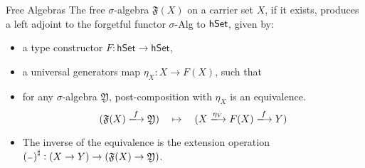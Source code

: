 \documentclass[9pt]{beamer}
\begin{document}
\begin{frame}{Free Algebras}
The free $\sigma$-algebra $\mathfrak{F}(X)$ on a carrier set $X$, \alert{if it exists}, produces a \alert{left adjoint} to the forgetful functor $\sigma$-Alg to $\mathsf{hSet}$, given by:
\begin{itemize}
    \item a type constructor $F : \mathsf{hSet} \to \mathsf{hSet}$,
    \item a universal generators map $\eta_X : X \to F(X)$, such that
    \item for any $\sigma$-algebra $\mathfrak{Y}$, post-composition with $\eta_X$ is an equivalence.
    \[
      (\str{F}{(X)} \xto{f} \mathfrak{Y}) \quad\mapsto\quad (X \xto{\eta_V} F(X) \xto{f} Y)
    \]

  \item The inverse of the equivalence is the extension operation
    ${({\scriptstyle{-}})}^{\sharp} : (X \to Y) \to (\mathfrak{F}{(X)} \to \mathfrak{Y})$.
\end{itemize}

% 
% 
% 


\end{frame}
\end{document}
